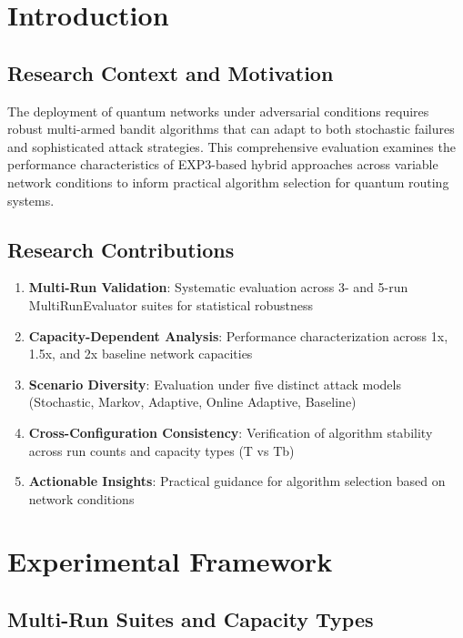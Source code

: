 \documentclass[11pt,a4paper]{article}
\begin{document}
\section{Introduction}

\subsection{Research Context and Motivation}

The deployment of quantum networks under adversarial conditions requires robust multi-armed bandit algorithms that can adapt to both stochastic failures and sophisticated attack strategies. This comprehensive evaluation examines the performance characteristics of EXP3-based hybrid approaches across variable network conditions to inform practical algorithm selection for quantum routing systems.

\subsection{Research Contributions}

\begin{enumerate}
\item \textbf{Multi-Run Validation}: Systematic evaluation across 3- and 5-run MultiRunEvaluator suites for statistical robustness
\item \textbf{Capacity-Dependent Analysis}: Performance characterization across 1x, 1.5x, and 2x baseline network capacities
\item \textbf{Scenario Diversity}: Evaluation under five distinct attack models (Stochastic, Markov, Adaptive, Online Adaptive, Baseline)
\item \textbf{Cross-Configuration Consistency}: Verification of algorithm stability across run counts and capacity types (T vs Tb)
\item \textbf{Actionable Insights}: Practical guidance for algorithm selection based on network conditions
\end{enumerate}

\section{Experimental Framework}

\subsection{Multi-Run Suites and Capacity Types}
\end{document}

